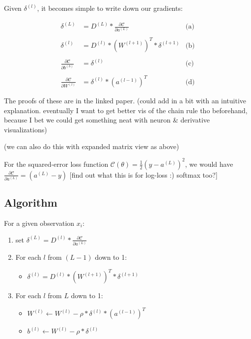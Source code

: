 \documentclass[
]{book}
\providecommand{\tightlist}{%
  \setlength{\itemsep}{0pt}\setlength{\parskip}{0pt}}
\begin{document}
Given \(\delta^{(l)}\), it becomes simple to write down our gradients:

\[
\begin{aligned}
  \delta^{(L)} &= D^{(L)} * \frac{\partial \mathcal{C}}{\partial a^{(L)}} & \text{(a)} \\ \\
  \delta^{(l)} &= D^{(l)} * \left(W^{(l + 1)}\right)^T * \delta^{(l + 1)} & \text{(b)} \\ \\
  \frac{\partial \mathcal{C}}{\partial b^{(b)}} &= \delta^{(l)} & \text{(c)} \\ \\
  \frac{\partial \mathcal{C}}{\partial W^{(l)}} &= \delta^{(l)} * \left(a^{(l - 1)}\right)^T & \text{(d)}
\end{aligned}
\]

The proofs of these are in the linked paper. (could add in a bit with an intuitive explanation. eventually I want to get better vis of the chain rule tho beforehand, because I bet we could get something neat with neuron \& derivative visualizations)

(we can also do this with expanded matrix view as above)

For the squared-error loss function \(\mathcal{C}(\theta) = \frac{1}{2} (y - a^{(L)})^2\), we would have \(\frac{\partial \mathcal{C}}{\partial a^{(L)}} = (a^{(L)} - y)\) {[}find out what this is for log-loss :) softmax too?{]}

\hypertarget{algorithm-1}{%
\subsection{Algorithm}\label{algorithm-1}}

For a given observation \(x_i\):

\begin{enumerate}
\def\labelenumi{\arabic{enumi}.}
\tightlist
\item
  set \(\delta^{(L)} = D^{(l)} * \frac{\partial \mathcal{C}}{\partial a^{(L)}}\)
\item
  For each \(l\) from \((L - 1)\) down to 1:

  \begin{itemize}
  \tightlist
  \item
    \(\delta^{(l)} = D^{(l)} * \left(W^{(l + 1)}\right)^T * \delta^{(l + 1)}\)
  \end{itemize}
\item
  For each \(l\) from \(L\) down to 1:

  \begin{itemize}
  \tightlist
  \item
    \(W^{(l)} \leftarrow W^{(l)} - \rho * \delta^{(l)} * \left(a^{(l - 1)}\right)^T\)
  \item
    \(b^{(l)} \leftarrow W^{(l)} - \rho * \delta^{(l)}\)
  \end{itemize}
\end{enumerate}
\end{document}
